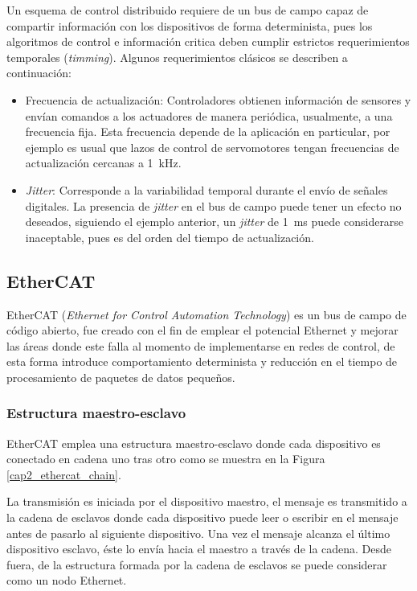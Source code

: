 Un esquema de control distribuido requiere de un bus de campo capaz de compartir información con los dispositivos de forma determinista, pues los algoritmos de control e información critica deben cumplir estrictos requerimientos temporales (\textit{timming}). Algunos requerimientos clásicos se describen a continuación:

\begin{itemize}

\item Frecuencia de actualización: Controladores obtienen información de sensores y envían comandos a los actuadores de manera periódica, usualmente, a una frecuencia fija. Esta frecuencia depende de la aplicación en particular, por ejemplo es usual que lazos de control de servomotores tengan frecuencias de actualización cercanas a \SI{1}{kHz}.

\item \textit{Jitter}: Corresponde a la variabilidad temporal durante el envío de señales digitales. La presencia de \textit{jitter} en el bus de campo puede tener un efecto no deseados, siguiendo el ejemplo anterior, un \textit{jitter} de \SI{1}{\milli\second} puede considerarse inaceptable, pues es del orden del tiempo de actualización.

\end{itemize}


\subsection{EtherCAT}

EtherCAT (\textit{Ethernet for Control Automation Technology}) es un bus de campo de código abierto, fue creado con el fin de emplear el potencial Ethernet y mejorar las áreas donde este falla al momento de implementarse en redes de control, de esta forma introduce comportamiento determinista y reducción en el tiempo de procesamiento de paquetes de datos pequeños.

\subsubsection{Estructura maestro-esclavo}

EtherCAT emplea una estructura maestro-esclavo donde cada dispositivo es conectado en cadena uno tras otro como se muestra en la Figura \ref{cap2_ethercat_chain}.

La transmisión es iniciada por el dispositivo maestro, el mensaje es transmitido a la cadena de esclavos donde cada dispositivo puede leer o escribir en el mensaje antes de pasarlo al siguiente dispositivo. Una vez el mensaje alcanza el último dispositivo esclavo, éste lo envía hacia el maestro a través de la cadena. Desde fuera, de la estructura formada por la cadena de esclavos se puede considerar como un nodo Ethernet.

